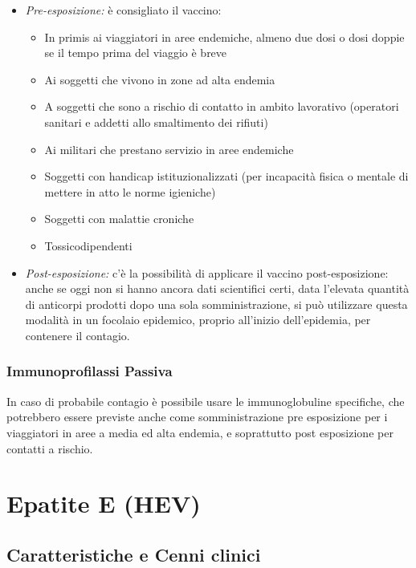 \begin{itemize}
\item
  \emph{Pre-esposizione:} è consigliato il vaccino:

  \begin{itemize}
  \item
    In primis ai viaggiatori in aree endemiche, almeno due dosi o dosi
    doppie se il tempo prima del viaggio è breve
  \item
    Ai soggetti che vivono in zone ad alta endemia
  \item
    A soggetti che sono a rischio di contatto in ambito lavorativo
    (operatori sanitari e addetti allo smaltimento dei rifiuti)
  \item
    Ai militari che prestano servizio in aree endemiche
  \item
    Soggetti con handicap istituzionalizzati (per incapacità fisica o
    mentale di mettere in atto le norme igieniche)
  \item
    Soggetti con malattie croniche
  \item
    Tossicodipendenti
  \end{itemize}
\item
  \emph{Post-esposizione:} c'è la possibilità di applicare il vaccino
  post-esposizione: anche se oggi non si hanno ancora dati scientifici
  certi, data l'elevata quantità di anticorpi prodotti dopo una sola
  somministrazione, si può utilizzare questa modalità in un focolaio
  epidemico, proprio all'inizio dell'epidemia, per contenere il
  contagio.
\end{itemize}

\subsubsection{Immunoprofilassi Passiva}



In caso di probabile contagio è possibile usare le immunoglobuline
specifiche, che potrebbero essere previste anche come somministrazione
pre esposizione per i viaggiatori in aree a media ed alta endemia, e
soprattutto post esposizione per contatti a rischio.


\section{Epatite E (HEV)}



\subsection{Caratteristiche e Cenni clinici }


